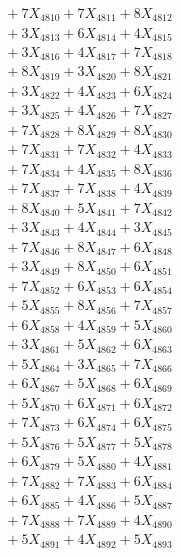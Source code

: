 \documentclass[a4paper,10pt]{article}
\begin{document}
{\begin{align}
&\;  + 7 X_{4810} + 7 X_{4811} + 8 X_{4812} \\[0.3ex]
&\;  + 3 X_{4813} + 6 X_{4814} + 4 X_{4815} \\[0.3ex]
&\;  + 3 X_{4816} + 4 X_{4817} + 7 X_{4818} \\[0.3ex]
&\;  + 8 X_{4819} + 3 X_{4820} + 8 X_{4821} \\[0.3ex]
&\;  + 3 X_{4822} + 4 X_{4823} + 6 X_{4824} \\[0.3ex]
&\;  + 3 X_{4825} + 4 X_{4826} + 7 X_{4827} \\[0.3ex]
&\;  + 7 X_{4828} + 8 X_{4829} + 8 X_{4830} \\[0.3ex]
&\;  + 7 X_{4831} + 7 X_{4832} + 4 X_{4833} \\[0.3ex]
&\;  + 7 X_{4834} + 4 X_{4835} + 8 X_{4836} \\[0.3ex]
&\;  + 7 X_{4837} + 7 X_{4838} + 4 X_{4839} \\[0.5ex]\allowbreak
&\;  + 8 X_{4840} + 5 X_{4841} + 7 X_{4842} \\[0.3ex]
&\;  + 3 X_{4843} + 4 X_{4844} + 3 X_{4845} \\[0.3ex]
&\;  + 7 X_{4846} + 8 X_{4847} + 6 X_{4848} \\[0.3ex]
&\;  + 3 X_{4849} + 8 X_{4850} + 6 X_{4851} \\[0.3ex]
&\;  + 7 X_{4852} + 6 X_{4853} + 6 X_{4854} \\[0.3ex]
&\;  + 5 X_{4855} + 8 X_{4856} + 7 X_{4857} \\[0.3ex]
&\;  + 6 X_{4858} + 4 X_{4859} + 5 X_{4860} \\[0.3ex]
&\;  + 3 X_{4861} + 5 X_{4862} + 6 X_{4863} \\[0.3ex]
&\;  + 5 X_{4864} + 3 X_{4865} + 7 X_{4866} \\[0.3ex]
&\;  + 6 X_{4867} + 5 X_{4868} + 6 X_{4869} \\[0.5ex]\allowbreak
&\;  + 5 X_{4870} + 6 X_{4871} + 6 X_{4872} \\[0.3ex]
&\;  + 7 X_{4873} + 6 X_{4874} + 6 X_{4875} \\[0.3ex]
&\;  + 5 X_{4876} + 5 X_{4877} + 5 X_{4878} \\[0.3ex]
&\;  + 6 X_{4879} + 5 X_{4880} + 4 X_{4881} \\[0.3ex]
&\;  + 7 X_{4882} + 7 X_{4883} + 6 X_{4884} \\[0.3ex]
&\;  + 6 X_{4885} + 4 X_{4886} + 5 X_{4887} \\[0.3ex]
&\;  + 7 X_{4888} + 7 X_{4889} + 4 X_{4890} \\[0.3ex]
&\;  + 5 X_{4891} + 4 X_{4892} + 5 X_{4893} \\[0.3ex]

\end{align}}
\end{document}

